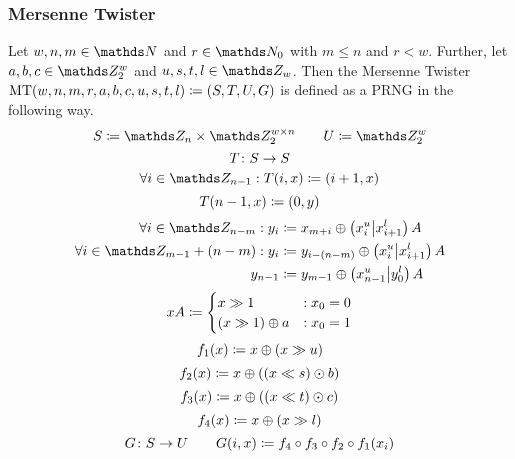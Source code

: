 \documentclass{stdlocal}
\begin{document}
    \subsubsection*{Mersenne Twister} %
    \label{ssub:mersenne_twister}
      \begin{definition}
        Let $w, n, m\in \setNatural$ and $r\in\setNatural_0$ with $m \leq n$ and $r < w$.
        Further, let $a,b,c \in \setInteger_2^w$ and $u,s,t,l \in \setInteger_w$.
        Then the Mersenne Twister $\mathrm{MT}(w,n,m,r,a,b,c,u,s,t,l)\coloneqq (S,T,U,G)$ is defined as a PRNG in the following way.
        \[
          S \define \setInteger_n \times \setInteger_2^{w\times n}
          \separate
          U \define \setInteger_2^w
        \]
        \[
          T\colon S\to S
        \]
        \[
          \forall i\in\setInteger_{n-1}: T(i, x) \define (i + 1, x)
        \]
        \[
          T(n-1, x) \coloneqq (0, y)
        \]
        \begin{align*}
          \forall i\in\setInteger_{n-m}: y_i &\define x_{m+i} \oplus \roundBrackets{x_i^u \middle\vert x_{i+1}^l}A \\
          \forall i\in\setInteger_{m-1} + (n-m): y_i &\define y_{i-(n-m)} \oplus \roundBrackets{x_i^u \middle\vert x_{i+1}^l}A \\
          y_{n-1} &\define y_{m-1} \oplus \roundBrackets{x^u_{n-1} \middle\vert y_0^l}A
        \end{align*}
        \[
          xA \coloneqq
          \begin{cases}
            x \gg 1 &: x_0 = 0 \\
            (x \gg 1) \oplus a &: x_0 = 1
          \end{cases}
        \]
        \[
          f_1(x) \coloneqq x \oplus (x \gg u)
        \]
        \[
          f_2(x) \coloneqq x \oplus ((x \ll s) \odot b)
        \]
        \[
          f_3(x) \coloneqq x \oplus ((x \ll t) \odot c)
        \]
        \[
          f_4(x) \coloneqq x \oplus (x \gg l)
        \]
        \[
          G\colon S\to U
          \qquad
          G(i,x) \coloneqq f_4 \circ f_3 \circ f_2 \circ f_1(x_i)
        \]
      \end{definition}
\end{document}
